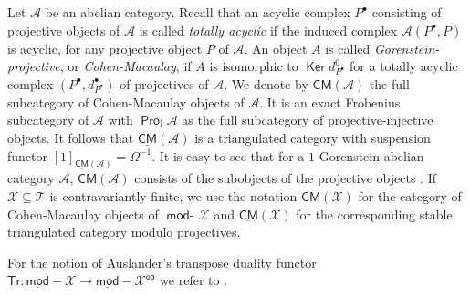 \documentclass[oneside, a4paper,reqno]{amsart}
\numberwithin{equation}{section}
\theoremstyle{definition}
\begin{document}
Let ${\mathscr A}$ be an abelian category. Recall that an acyclic complex $P^{\bullet}$ consisting of projective objects of ${\mathscr A}$ is called {\em totally acyclic} if the induced complex ${\mathscr A}(P^{\bullet},P)$ is acyclic, for any projective object $P$ of ${\mathscr A}$. An object $A$ is called {\em Gorenstein-projective}, or {\em Cohen-Macaulay}, if  $A$ is isomorphic to $\operatorname*{\mathsf{Ker}} d^{0}_{P^{\bullet}}$ for a totally acyclic complex $(P^{\bullet},d^{\bullet}_{P^{\bullet}})$ of projectives of ${\mathscr A}$. We denote by $\mathsf{CM}({\mathscr A})$ the full subcategory of Cohen-Macaulay objects of ${\mathscr A}$. It is an exact Frobenius subcategory of ${\mathscr A}$ with $\operatorname*{\mathsf{Proj}}{\mathscr A}$ as the full subcategory of projective-injective objects. It follows that $\underline{\mathsf{CM}}({\mathscr A})$ is a triangulated category with suspension functor $[1]_{\underline{\mathsf{CM}}({\mathscr A})} = \Omega^{-1}$. It is easy to see that for a $1$-Gorenstein abelian category ${\mathscr A}$, $\mathsf{CM}({\mathscr A})$ consists of the subobjects of the projective objects \cite{B:gor}. If ${\mathcal X} \subseteq {\mathcal T}$ is contravariantly finite, we use the notation $\mathsf{CM}({\mathcal X})$ for the category of Cohen-Macaulay objects of $\operatorname*{\mathsf{mod}-\!}{\mathcal X}$ and $\underline{\mathsf{CM}}({\mathcal X})$ for the corresponding stable triangulated category modulo projectives. 

For the notion of Auslander's transpose duality functor $\mathsf{Tr} \colon \operatorname*{\underline{\mathsf{mod}}-\!}{\mathcal X} {\longrightarrow} \operatorname*{\underline{\mathsf{mod}}-\!}{\mathcal X}^\operatorname*{\mathsf{op}}$ we refer to \cite{AR}.   
\end{document}
